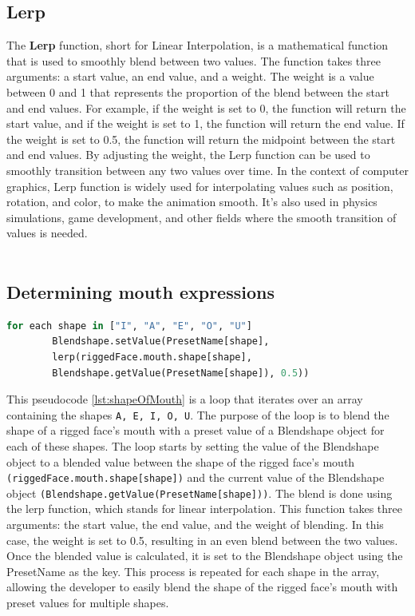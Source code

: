 \subsection{Lerp}
The \textbf{Lerp} function, short for Linear Interpolation, is a mathematical function that is 
used to smoothly blend between two values. The function takes three arguments: a start value, 
an end value, and a weight. The weight is a value between 0 and 1 that represents the proportion 
of the blend between the start and end values.
For example, if the weight is set to 0, the function will return the start 
value, and if the weight is set to 1, the function will return the end value. 
If the weight is set to 0.5, the function will return the midpoint between the 
start and end values. By adjusting the weight, the Lerp function can be used to 
smoothly transition between any two values over time.
In the context of computer graphics, Lerp function is widely used for 
interpolating values such as position, rotation, and color, to make the 
animation smooth. It's also used in physics simulations, game development, 
and other fields where the smooth transition of values is needed.
\\
\\
\subsection{Determining mouth expressions}

\begin{lstlisting}[language=Python,caption=Shape of mouth,label=lst:shapeOfMouth]
    for each shape in ["I", "A", "E", "O", "U"]
        Blendshape.setValue(PresetName[shape], 
        lerp(riggedFace.mouth.shape[shape], 
        Blendshape.getValue(PresetName[shape]), 0.5))

\end{lstlisting}
This pseudocode \ref{lst:shapeOfMouth} is a loop that iterates over an array containing the shapes \texttt{A, E, I, O, U}. 
The purpose of the loop is to blend the shape of a rigged face's mouth with a preset value of a 
Blendshape object for each of these shapes. The loop starts by setting the value of the Blendshape 
object to a blended value between the shape of the rigged face's mouth \texttt{(riggedFace.mouth.shape[shape])}
and the current value of the Blendshape object \texttt{(Blendshape.getValue(PresetName[shape]))}. 
The blend is done using the lerp function, which stands for linear interpolation. 
This function takes three arguments: the start value, the end value, and the weight of blending. 
In this case, the weight is set to 0.5, resulting in an even blend between the two values.
Once the blended value is calculated, it is set to the Blendshape object using the PresetName 
as the key. This process is repeated for each shape in the array, allowing the developer to 
easily blend the shape of the rigged face's mouth with preset values for multiple shapes.
\\
\\
